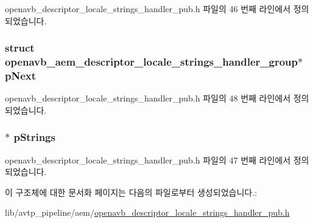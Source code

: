 openavb\+\_\+descriptor\+\_\+locale\+\_\+strings\+\_\+handler\+\_\+pub.\+h 파일의 46 번째 라인에서 정의되었습니다.

\subsubsection[{\texorpdfstring{p\+Next}{pNext}}]{\setlength{\rightskip}{0pt plus 5cm}struct {\bf openavb\+\_\+aem\+\_\+descriptor\+\_\+locale\+\_\+strings\+\_\+handler\+\_\+group}$\ast$ p\+Next}\hypertarget{structopenavb__aem__descriptor__locale__strings__handler__group_a5875a7a829d125ac84c4e38192999754}{}\label{structopenavb__aem__descriptor__locale__strings__handler__group_a5875a7a829d125ac84c4e38192999754}


openavb\+\_\+descriptor\+\_\+locale\+\_\+strings\+\_\+handler\+\_\+pub.\+h 파일의 48 번째 라인에서 정의되었습니다.

\subsubsection[{\texorpdfstring{p\+Strings}{pStrings}}]{$\ast$ p\+Strings}\hypertarget{structopenavb__aem__descriptor__locale__strings__handler__group_a81090c0301cd642eb9693980b69b98f0}{}\label{structopenavb__aem__descriptor__locale__strings__handler__group_a81090c0301cd642eb9693980b69b98f0}


openavb\+\_\+descriptor\+\_\+locale\+\_\+strings\+\_\+handler\+\_\+pub.\+h 파일의 47 번째 라인에서 정의되었습니다.



이 구조체에 대한 문서화 페이지는 다음의 파일로부터 생성되었습니다.\+:\begin{DoxyCompactItemize}
\item 
lib/avtp\+\_\+pipeline/aem/\hyperlink{openavb__descriptor__locale__strings__handler__pub_8h}{openavb\+\_\+descriptor\+\_\+locale\+\_\+strings\+\_\+handler\+\_\+pub.\+h}\end{DoxyCompactItemize}

